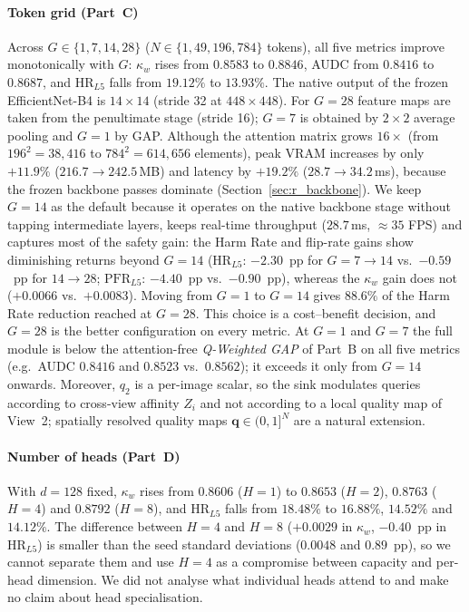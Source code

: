 \documentclass[final,5p,times,twocolumn,authoryear]{elsarticle}
\theoremstyle{plain}
\theoremstyle{remark}
\begin{document}
\paragraph{Token grid (Part~C)} Across $G \in \{1,7,14,28\}$ ($N \in \{1,49,196,784\}$ tokens), all five metrics improve monotonically with $G$: $\kappa_w$ rises from $0.8583$ to $0.8846$, AUDC from $0.8416$ to $0.8687$, and $\text{HR}_{L5}$ falls from $19.12\%$ to $13.93\%$. The native output of the frozen EfficientNet-B4 is $14\times14$ (stride 32 at $448\times448$). For $G=28$ feature maps are taken from the penultimate stage (stride 16); $G=7$ is obtained by $2\times2$ average pooling and $G=1$ by GAP. Although the attention matrix grows $16\times$ (from $196^2=38{,}416$ to $784^2=614{,}656$ elements), peak VRAM increases by only $+11.9\%$ ($216.7 \to 242.5$\,MB) and latency by $+19.2\%$ ($28.7 \to 34.2$\,ms), because the frozen backbone passes dominate (Section~\ref{sec:r_backbone}). We keep $G=14$ as the default because it operates on the native backbone stage without tapping intermediate layers, keeps real-time throughput ($28.7$\,ms, $\approx 35$ FPS) and captures most of the safety gain: the Harm Rate and flip-rate gains show diminishing returns beyond $G=14$ ($\text{HR}_{L5}$: $-2.30$~pp for $G=7\to14$ vs.\ $-0.59$~pp for $14\to28$; $\text{PFR}_{L5}$: $-4.40$~pp vs.\ $-0.90$~pp), whereas the $\kappa_w$ gain does not ($+0.0066$ vs.\ $+0.0083$). Moving from $G=1$ to $G=14$ gives $88.6\%$ of the Harm Rate reduction reached at $G=28$. This choice is a cost--benefit decision, and $G=28$ is the better configuration on every metric. At $G=1$ and $G=7$ the full module is below the attention-free \emph{Q-Weighted GAP} of Part~B on all five metrics (e.g.\ AUDC $0.8416$ and $0.8523$ vs.\ $0.8562$); it exceeds it only from $G=14$ onwards. Moreover, $q_2$ is a per-image scalar, so the sink modulates queries according to cross-view affinity $Z_i$ and not according to a local quality map of View~2; spatially resolved quality maps $\mathbf{q}\in(0,1]^N$ are a natural extension.

\paragraph{Number of heads (Part~D)} With $d=128$ fixed, $\kappa_w$ rises from $0.8606$ ($H=1$) to $0.8653$ ($H=2$), $0.8763$ ($H=4$) and $0.8792$ ($H=8$), and $\text{HR}_{L5}$ falls from $18.48\%$ to $16.88\%$, $14.52\%$ and $14.12\%$. The difference between $H=4$ and $H=8$ ($+0.0029$ in $\kappa_w$, $-0.40$~pp in $\text{HR}_{L5}$) is smaller than the seed standard deviations ($0.0048$ and $0.89$~pp), so we cannot separate them and use $H=4$ as a compromise between capacity and per-head dimension. We did not analyse what individual heads attend to and make no claim about head specialisation.
\end{document}
